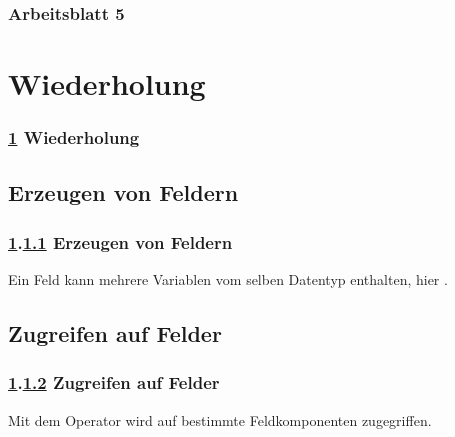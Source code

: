 \documentclass[9pt,german]{beamer}%
\begin{document}
\maketitle%
\addtocounter{framenumber}{-1}%

\begin{frame}
  \frametitle{Arbeitsblatt 5}%
\tableofcontents
\end{frame}
\setcounter{exercise}{20}


\section{Wiederholung}\label{K:wdh}
\begin{frame}
  \frametitle{\ref{K:wdh} Wiederholung}%
\tableofcontents[current]
\end{frame}

\def\stitle{Erzeugen von Feldern}
\subsection{\stitle}\label{S:Erzeugen}
\begin{frame}[t]%
  \frametitle{\ref{K:wdh}.\ref{S:Erzeugen} \stitle}
\medskip

Ein Feld kann mehrere Variablen vom selben Datentyp enthalten, hier .


\end{frame}


\def\stitle{Zugreifen auf Felder}
\subsection{\stitle}\label{S:Zugreifen}
\begin{frame}[t]%
  \frametitle{\ref{K:wdh}.\ref{S:Zugreifen} \stitle}
\medskip

Mit dem Operator \code{[]} wird auf bestimmte Feldkomponenten zugegriffen.


\end{frame}
\end{document}

